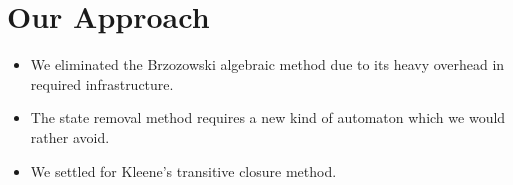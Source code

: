 \documentclass{beamer}
\begin{document}
\section{Our Approach}
\begin{frame}
    \begin{itemize}
        \item
            We eliminated the Brzozowski algebraic method due to its heavy overhead in required infrastructure.

            \pause

        \item
            The state removal method requires a new kind of automaton which we would rather avoid.

            \pause

        \item
            We settled for Kleene's transitive closure method.

    \end{itemize}
\end{frame}
\end{document}
